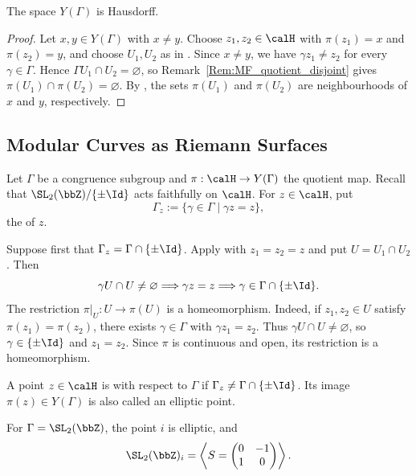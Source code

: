\begin{proposition}\label{Prop:MF_modular_curve_Hausdorff}
    The space $Y(\Gamma)$ is Hausdorff.
\end{proposition}

\begin{proof}
    Let $x, y \in Y(\Gamma)$ with $x \neq y$. Choose $z_1, z_2 \in \calH$ with $\pi(z_1) = x$ and $\pi(z_2) = y$, and choose $U_1, U_2$ as in . Since $x \neq y$, we have $\gamma z_1 \neq z_2$ for every $\gamma \in \Gamma$. Hence $\Gamma U_1 \cap U_2 = \varnothing$, so Remark~\ref{Rem:MF_quotient_disjoint} gives $\pi(U_1) \cap \pi(U_2) = \varnothing$. By , the sets $\pi(U_1)$ and $\pi(U_2)$ are neighbourhoods of $x$ and $y$, respectively.
\end{proof}

\subsection{Modular Curves as Riemann Surfaces}\label{Sec:MF_modular_curve_charts}

Let $\Gamma$ be a congruence subgroup and $\pi : \calH \to Y(\Gamma)$ the quotient map. Recall that $\SL_2(\bbZ)/\{\pm\Id\}$ acts faithfully on $\calH$. For $z \in \calH$, put
\[
    \Gamma_z := \{\gamma \in \Gamma \mid \gamma z = z\},
\]
the  of $z$.

Suppose first that $\Gamma_z = \Gamma \cap \{\pm\Id\}$. Apply  with $z_1 = z_2 = z$ and put $U = U_1 \cap U_2$. Then
\[
    \gamma U \cap U \neq \varnothing \Longrightarrow \gamma z = z \Longrightarrow \gamma \in \Gamma \cap \{\pm\Id\}.
\]
The restriction $\pi|_U : U \to \pi(U)$ is a homeomorphism. Indeed, if $z_1, z_2 \in U$ satisfy $\pi(z_1) = \pi(z_2)$, there exists $\gamma \in \Gamma$ with $\gamma z_1 = z_2$. Thus $\gamma U \cap U \neq \varnothing$, so $\gamma \in \{\pm\Id\}$ and $z_1 = z_2$. Since $\pi$ is continuous and open, its restriction is a homeomorphism.

\begin{definition}\label{Def:MF_elliptic_point}
    A point $z \in \calH$ is  with respect to $\Gamma$ if $\Gamma_z \neq \Gamma \cap \{\pm\Id\}$. Its image $\pi(z) \in Y(\Gamma)$ is also called an elliptic point.
\end{definition}

\begin{example}
    For $\Gamma = \SL_2(\bbZ)$, the point $i$ is elliptic, and
    \[
        \SL_2(\bbZ)_i = \left\langle S = \begin{pmatrix}0 & -1\\ 1 & 0\end{pmatrix}\right\rangle.
    \]
\end{example}

